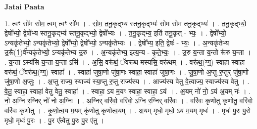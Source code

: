 \documentclass[17pt]{extarticle}
\begin{document}
\textbf{Jatai Paata} \newline

1. त्वꣳ सो॑म सोम॒ त्वम् त्वꣳ सो॑म । . सो॒म॒ त॒नू॒कृद्भ्य॑ स्तनू॒कृद्भ्यः॑ सोम सोम तनू॒कृद्भ्यः॑ । . त॒नू॒कृद्भ्यो॒ द्वेषो᳚भ्यो॒ द्वेषो᳚भ्य स्तनू॒कृद्भ्य॑ स्तनू॒कृद्भ्यो॒ द्वेषो᳚भ्यः । . त॒नू॒कृद्भ्य॒ इति॑ तनू॒कृत् - भ्यः॒ । . द्वेषो᳚भ्यो॒ ऽन्यकृ॑तेभ्यो॒ ऽन्यकृ॑तेभ्यो॒ द्वेषो᳚भ्यो॒ द्वेषो᳚भ्यो॒ ऽन्यकृ॑तेभ्यः । . द्वेषो᳚भ्य॒ इति॒ द्वेषः॑ - भ्यः॒ । . अ॒न्यकृ॑तेभ्य उ॒रू᳚(1॒)र्व॑न्यकृ॑तेभ्यो॒ ऽन्यकृ॑तेभ्य उ॒रु । . अ॒न्यकृ॑तेभ्य॒ इत्य॒न्य - कृ॒ते॒भ्यः॒ । . उ॒रु य॒न्ता य॒न्तो रू॑रु य॒न्ता । . य॒न्ता ऽस्य॑सि य॒न्ता य॒न्ता ऽसि॑ । . अ॒सि॒ वरू॑थं॒ ॅवरू॑थ मस्यसि॒ वरू॑थम् । . वरू॑थ॒(ग्ग्॒) स्वाहा॒ स्वाहा॒ वरू॑थं॒ ॅवरू॑थ॒(ग्ग्॒) स्वाहा᳚ । . स्वाहा॑ जुषा॒णो जु॑षा॒णः स्वाहा॒ स्वाहा॑ जुषा॒णः । . जु॒षा॒णो अ॒प्तु र॒प्तुर् जु॑षा॒णो जु॑षा॒णो अ॒प्तुः । . अ॒प्तु राज्य॒ स्याज्य॑ स्या॒प्तु र॒प्तु राज्य॑स्य । . आज्य॑स्य वेतु वे॒त्वाज्य॒ स्याज्य॑स्य वेतु । . वे॒तु॒ स्वाहा॒ स्वाहा॑ वेतु वेतु॒ स्वाहा᳚ । . स्वाहा॒ ऽय म॒यꣳ स्वाहा॒ स्वाहा॒ ऽयं । . अ॒यम् नो॑ नो॒ ऽयं अ॒यम् नः॑ । . नो॒ अ॒ग्नि र॒ग्निर् नो॑ नो अ॒ग्निः । . अ॒ग्निर् वरि॑वो॒ वरि॑वो॒ ऽग्नि र॒ग्निर् वरि॑वः । . वरि॑वः कृणोतु कृणोतु॒ वरि॑वो॒ वरि॑वः कृणोतु । . कृ॒णो॒त्व॒य म॒यम् कृ॑णोतु कृणोत्व॒यम् । . अ॒यम् मृधो॒ मृधो॒ ऽय म॒यम् मृधः॑ । . मृधः॑ पु॒रः पु॒रो मृधो॒ मृधः॑ पु॒रः । . पु॒र ए᳚त्वेतु पु॒रः पु॒र ए॑तु । \newline
\end{document}
